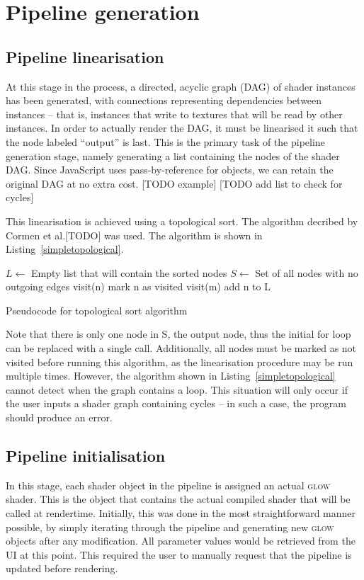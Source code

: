 \documentclass[12pt,twoside,notitlepage]{report}
\begin{document}
\clearpage
\section{Pipeline generation}
\subsection*{Pipeline linearisation}
At this stage in the process, a directed, acyclic graph (DAG) of shader instances has been generated, with connections representing dependencies between instances -- that is, instances that write to textures that will be read by other instances. In order to actually render the DAG, it must be linearised it such that the node labeled ``output'' is last. This is the primary task of the pipeline generation stage, namely generating a list containing the nodes of the shader DAG. Since JavaScript uses pass-by-reference for objects, we can retain the original DAG at no extra cost. 
[TODO example] [TODO add list to check for cycles]

This linearisation is achieved using a topological sort. The algorithm decribed by Cormen et al.[TODO] \cite{topsort} was used. The algorithm is shown in Listing~\ref{simpletopological}.
\begin{algorithm}
\begin{algorithmic}
\State $L \gets $ Empty list that will contain the sorted nodes
\State $S \gets $ Set of all nodes with no outgoing edges
    visit(n)
\EndFor 
{}
        mark n as visited
            visit(m)
        \EndFor
        add n to L
    \EndIf
\EndFunction
\end{algorithmic}
\caption{Pseudocode for topological sort algorithm\label{simpletopological}}
\end{algorithm}

Note that there is only one node in S, the output node, thus the initial for loop can be replaced with a single call. Additionally, all nodes must be marked as not visited before running this algorithm, as the linearisation procedure may be run multiple times. However, the algorithm shown in Listing~\ref{simpletopological} cannot detect when the graph contains a loop. This situation will only occur if the user inputs a shader graph containing cycles -- in such a case, the program should produce an error.

\subsection*{Pipeline initialisation}
\label{pipe-init}
In this stage, each shader object in the pipeline is assigned an actual \textsc{glow} shader. This is the object that contains the actual compiled shader that will be called at rendertime. Initially, this was done in the most straightforward manner possible, by simply iterating through the pipeline and generating new \textsc{glow} objects after any modification. All parameter values would be retrieved from the UI at this point. This required the user to manually request that the pipeline is updated before rendering. 
\end{document}
